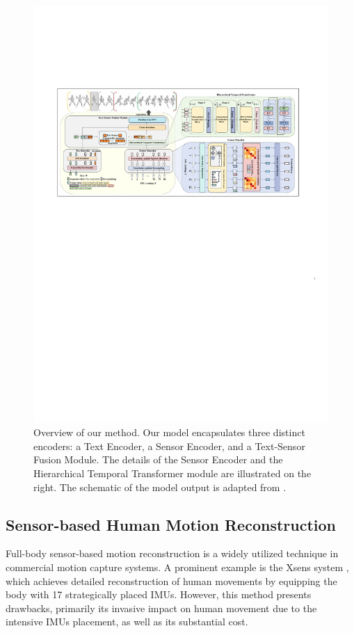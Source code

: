 \documentclass[letterpaper]{article} %
\begin{document}
\begin{figure}[!t]
\renewcommand{\baselinestretch}{1.0}
\centering
\includegraphics[width=7 in, height=3 in]{net_result.pdf}
\caption{Overview of our method. Our model encapsulates three distinct encoders: a Text Encoder, a Sensor Encoder, and a Text-Sensor Fusion Module. The details of the Sensor Encoder and the Hierarchical Temporal Transformer module are illustrated on the right. The schematic of the model output is adapted from \cite{BABEL:CVPR:2021}.}\label{fig2}
\end{figure}
\subsection{Sensor-based Human Motion Reconstruction}
Full-body sensor-based motion reconstruction is a widely utilized technique in commercial motion capture systems. A prominent example is the Xsens system \cite{schepers2018xsens}, which achieves detailed reconstruction of human movements by equipping the body with 17 strategically placed IMUs.
However, this method presents drawbacks, primarily its invasive impact on human movement due to the intensive IMUs placement, as well as its substantial cost.
\end{document}

